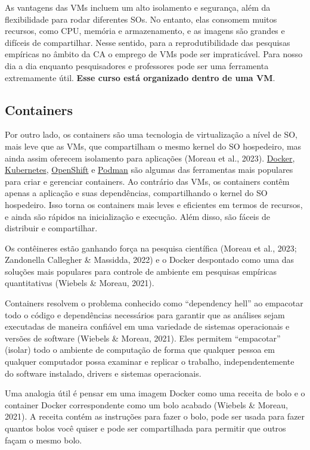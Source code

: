 \documentclass[
  a4paper,
]{book}
\begin{document}
As vantagens das VMs incluem um alto isolamento e segurança, além da
flexibilidade para rodar diferentes SOs. No entanto, elas consomem
muitos recursos, como CPU, memória e armazenamento, e as imagens são
grandes e difíceis de compartilhar. Nesse sentido, para a
reprodutibilidade das pesquisas empíricas no âmbito da CA o emprego de
VMs pode ser impraticável. Para nosso dia a dia enquanto pesquisadores e
professores pode ser uma ferramenta extremamente útil. \textbf{Esse
curso está organizado dentro de uma VM}.

\subsection{Containers}\label{containers}

Por outro lado, os containers são uma tecnologia de virtualização a
nível de SO, mais leve que as VMs, que compartilham o mesmo kernel do SO
hospedeiro, mas ainda assim oferecem isolamento para aplicações (Moreau
et al., 2023). \href{https://www.docker.com/}{Docker},
\href{https://kubernetes.io/}{Kubernetes},
\href{https://www.redhat.com/en/technologies/cloud-computing/openshift}{OpenShift}
e \href{https://podman.io/}{Podman} são algumas das ferramentas mais
populares para criar e gerenciar containers. Ao contrário das VMs, os
containers contêm apenas a aplicação e suas dependências, compartilhando
o kernel do SO hospedeiro. Isso torna os containers mais leves e
eficientes em termos de recursos, e ainda são rápidos na inicialização e
execução. Além disso, são fáceis de distribuir e compartilhar.

Os contêineres estão ganhando força na pesquisa científica (Moreau et
al., 2023; Zandonella Callegher \& Massidda, 2022) e o Docker despontado
como uma das soluções mais populares para controle de ambiente em
pesquisas empíricas quantitativas (Wiebels \& Moreau, 2021).

Containers resolvem o problema conhecido como ``dependency hell'' ao
empacotar todo o código e dependências necessários para garantir que as
análises sejam executadas de maneira confiável em uma variedade de
sistemas operacionais e versões de software (Wiebels \& Moreau, 2021).
Eles permitem ``empacotar'' (isolar) todo o ambiente de computação de
forma que qualquer pessoa em qualquer computador possa examinar e
replicar o trabalho, independentemente do software instalado, drivers e
sistemas operacionais.

Uma analogia útil é pensar em uma imagem Docker como uma receita de bolo
e o container Docker correspondente como um bolo acabado (Wiebels \&
Moreau, 2021). A receita contém as instruções para fazer o bolo, pode
ser usada para fazer quantos bolos você quiser e pode ser compartilhada
para permitir que outros façam o mesmo bolo.
\end{document}
